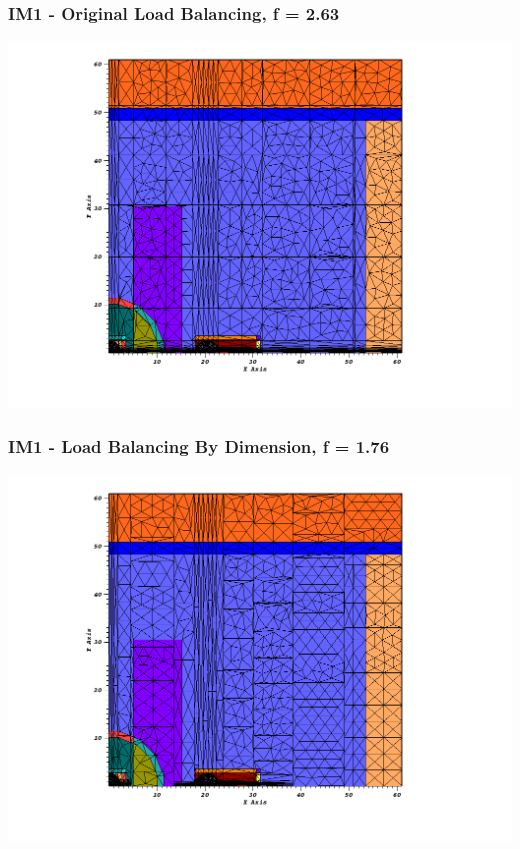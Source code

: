 \documentclass[compress]{beamer}
\begin{document}
\begin{frame}[t]\frametitle{IM1 - Original Load Balancing, f = 2.63}
\centering
\includegraphics[scale=0.33]{figures/IM1_old_load_balance.png}
\end{frame}

\begin{frame}[t]\frametitle{IM1 - Load Balancing By Dimension, f = 1.76}
\centering
\includegraphics[scale=0.33]{figures/IM1_new_load_balance.png}
\end{frame}
\end{document}
